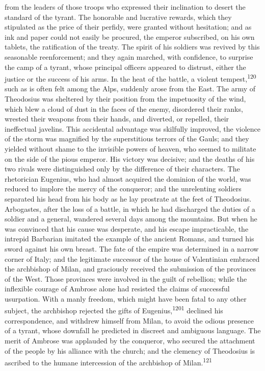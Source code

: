 from the leaders of those troops who expressed their inclination
to desert the standard of the tyrant. The honorable and lucrative
rewards, which they stipulated as the price of their perfidy,
were granted without hesitation; and as ink and paper could not
easily be procured, the emperor subscribed, on his own tablets,
the ratification of the treaty. The spirit of his soldiers was
revived by this seasonable reenforcement; and they again marched,
with confidence, to surprise the camp of a tyrant, whose
principal officers appeared to distrust, either the justice or
the success of his arms. In the heat of the battle, a violent
tempest,\textsuperscript{120} such as is often felt among the Alps, suddenly arose
from the East. The army of Theodosius was sheltered by their
position from the impetuosity of the wind, which blew a cloud of
dust in the faces of the enemy, disordered their ranks, wrested
their weapons from their hands, and diverted, or repelled, their
ineffectual javelins. This accidental advantage was skilfully
improved, the violence of the storm was magnified by the
superstitious terrors of the Gauls; and they yielded without
shame to the invisible powers of heaven, who seemed to militate
on the side of the pious emperor. His victory was decisive; and
the deaths of his two rivals were distinguished only by the
difference of their characters. The rhetorician Eugenius, who had
almost acquired the dominion of the world, was reduced to implore
the mercy of the conqueror; and the unrelenting soldiers
separated his head from his body as he lay prostrate at the feet
of Theodosius. Arbogastes, after the loss of a battle, in which
he had discharged the duties of a soldier and a general, wandered
several days among the mountains. But when he was convinced that
his cause was desperate, and his escape impracticable, the
intrepid Barbarian imitated the example of the ancient Romans,
and turned his sword against his own breast. The fate of the
empire was determined in a narrow corner of Italy; and the
legitimate successor of the house of Valentinian embraced the
archbishop of Milan, and graciously received the submission of
the provinces of the West. Those provinces were involved in the
guilt of rebellion; while the inflexible courage of Ambrose alone
had resisted the claims of successful usurpation. With a manly
freedom, which might have been fatal to any other subject, the
archbishop rejected the gifts of Eugenius,\textsuperscript{1201} declined his
correspondence, and withdrew himself from Milan, to avoid the
odious presence of a tyrant, whose downfall he predicted in
discreet and ambiguous language. The merit of Ambrose was
applauded by the conqueror, who secured the attachment of the
people by his alliance with the church; and the clemency of
Theodosius is ascribed to the humane intercession of the
archbishop of Milan.\textsuperscript{121}

